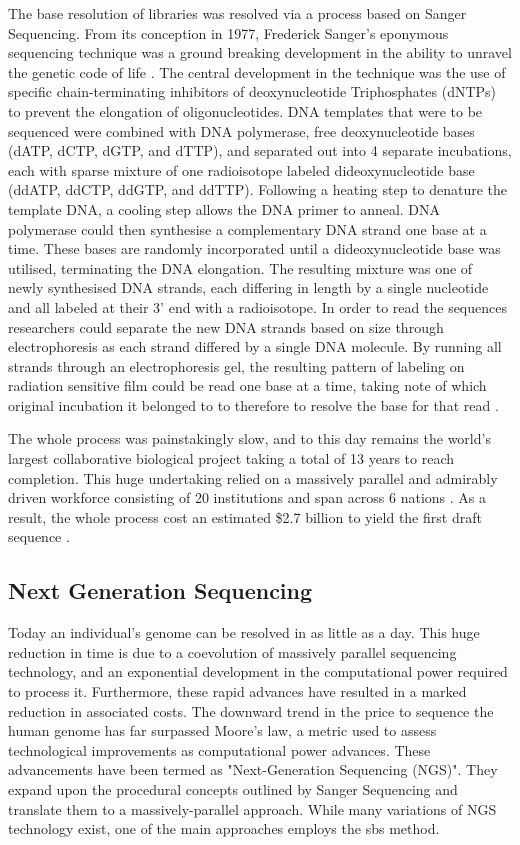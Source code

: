 The base resolution of libraries was resolved via a process based on Sanger Sequencing. From its conception in 1977, Frederick Sanger's eponymous sequencing technique was a ground breaking development in the ability to unravel the genetic code of life \cite{Sanger1977}. The central development in the technique was the use of specific chain-terminating inhibitors of deoxynucleotide Triphosphates (dNTPs) to prevent the elongation of oligonucleotides. DNA templates that were to be sequenced were combined with DNA polymerase, free deoxynucleotide bases (dATP, dCTP, dGTP, and dTTP), and separated out into 4 separate incubations, each with sparse mixture of one radioisotope labeled dideoxynucleotide base (ddATP, ddCTP, ddGTP, and ddTTP). Following a heating step to denature the template DNA, a cooling step allows the DNA primer to anneal. DNA polymerase could then synthesise a complementary DNA strand one base at a time. These bases are randomly incorporated until a dideoxynucleotide base was utilised, terminating the DNA elongation. The resulting mixture was one of newly synthesised DNA strands, each differing in length by a single nucleotide and all labeled at their 3' end with a radioisotope. In order to read the sequences researchers could separate the new DNA strands based on size through electrophoresis as each strand differed by a single DNA molecule. By running all strands through an electrophoresis gel, the resulting pattern of labeling on radiation sensitive film could be read one base at a time, taking note of which original incubation it belonged to to therefore to resolve the base for that read \cite{Pareek2011}. 

The whole process was painstakingly slow, and to this day remains the world’s largest collaborative biological project taking a total of 13 years to reach completion. This huge undertaking relied on a massively parallel and admirably driven workforce consisting of 20 institutions and span across 6 nations \cite{NHGRI}. As a result, the whole process cost an estimated \$2.7 billion to yield the first draft sequence \cite{Pareek2011}. 


\subsection{Next Generation Sequencing}

Today an individual’s genome can be resolved in as little as a day. This huge reduction in time is due to a coevolution of massively parallel sequencing technology, and an exponential development in the computational power required to process it. Furthermore, these rapid advances have resulted in a marked reduction in associated costs.  The downward trend in the price to sequence the human genome has far surpassed Moore’s law, a metric used to assess technological improvements as computational power advances. These advancements have been termed as "Next-Generation Sequencing (NGS)". They expand upon the procedural concepts outlined by Sanger Sequencing and translate them to a massively-parallel approach. While many variations of NGS technology exist, one of the main approaches employs the \acrfull{sbs} method. 

